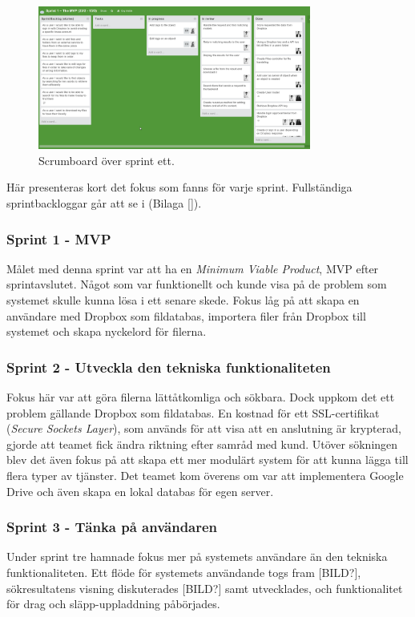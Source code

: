 \begin{figure}[!H]
\centering
\includegraphics[width=0.8\textwidth]{figures/trello.png}
\caption{Scrumboard över sprint ett.}
\label{fig:trello}
\end{figure}

Här presenteras kort det fokus som fanns för varje sprint. Fullständiga sprintbackloggar går att se i (Bilaga []).

\subsubsection{Sprint 1 - MVP}
Målet med denna sprint var att ha en \textit{Minimum Viable Product}, MVP\cite{mvp} efter sprintavslutet. Något som var funktionellt och kunde visa på de problem som systemet skulle kunna lösa i ett senare skede. Fokus låg på att skapa en användare med Dropbox som fildatabas, importera filer från Dropbox till systemet och skapa nyckelord för filerna.

\subsubsection{Sprint 2 - Utveckla den tekniska funktionaliteten}
Fokus här var att göra filerna lättåtkomliga och sökbara. Dock uppkom det ett problem gällande Dropbox som fildatabas. En kostnad för ett SSL-certifikat (\textit{Secure Sockets Layer}), som används för att visa att en anslutning är krypterad, gjorde att teamet fick ändra riktning efter samråd med kund. Utöver sökningen blev det även fokus på att skapa ett mer modulärt system för att kunna lägga till flera typer av tjänster. Det teamet kom överens om var att implementera Google Drive och även skapa en lokal databas för egen server.

\subsubsection{Sprint 3 - Tänka på användaren}
Under sprint tre hamnade fokus mer på systemets användare än den tekniska funktionaliteten. Ett flöde för systemets användande togs fram [BILD?], sökresultatens visning diskuterades [BILD?] samt utvecklades, och funktionalitet för drag och släpp-uppladdning påbörjades.

